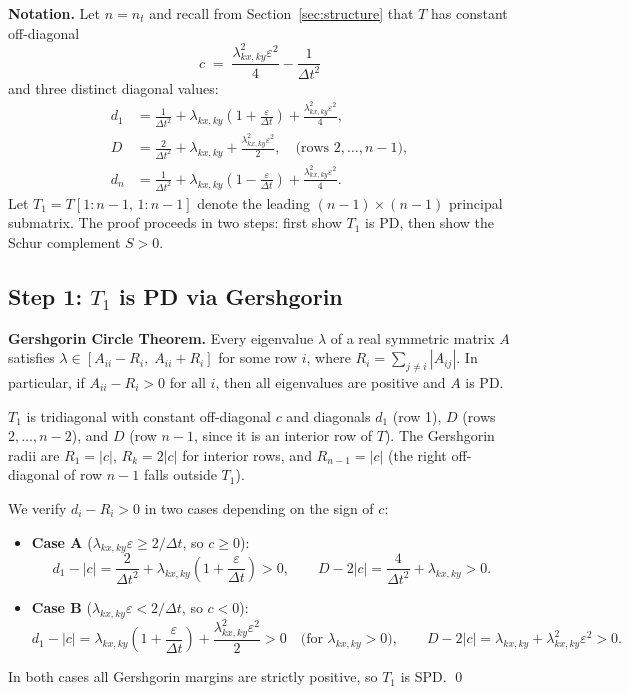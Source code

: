 \documentclass[11pt]{article}
\newcommand{\eps}{\varepsilon}
\newcommand{\dt}{\Delta t}
\newcommand{\lxy}{\lambda_{kx,ky}}
\begin{document}
\medskip
\noindent
\textbf{Notation.} Let $n = n_t$ and recall from Section~\ref{sec:structure} that
$T$ has constant off-diagonal
\[
  c \;=\; \frac{\lxy^2 \eps^2}{4} - \frac{1}{\dt^2}
\]
and three distinct diagonal values:
\begin{align*}
  d_1   &= \frac{1}{\dt^2} + \lxy\!\left(1+\frac{\eps}{\dt}\right) + \frac{\lxy^2\eps^2}{4}, \\
  D     &= \frac{2}{\dt^2} + \lxy + \frac{\lxy^2\eps^2}{2},
            \quad \text{(rows } 2,\ldots,n-1\text{)}, \\
  d_n   &= \frac{1}{\dt^2} + \lxy\!\left(1-\frac{\eps}{\dt}\right) + \frac{\lxy^2\eps^2}{4}.
\end{align*}
Let $T_1 = T[1:n-1,\,1:n-1]$ denote the leading $(n-1)\times(n-1)$ principal submatrix.
The proof proceeds in two steps: first show $T_1$ is PD, then show the Schur complement
$S > 0$.

\subsection{Step 1: $T_1$ is PD via Gershgorin}

\textbf{Gershgorin Circle Theorem.}
Every eigenvalue $\lambda$ of a real symmetric matrix $A$ satisfies
$\lambda \in [A_{ii} - R_i,\; A_{ii} + R_i]$ for some row $i$,
where $R_i = \sum_{j \neq i} |A_{ij}|$.
In particular, if $A_{ii} - R_i > 0$ for all $i$, then all eigenvalues are positive
and $A$ is PD.

\medskip
$T_1$ is tridiagonal with constant off-diagonal $c$ and diagonals
$d_1$ (row 1), $D$ (rows $2,\ldots,n-2$), and $D$ (row $n-1$, since it is an interior row of $T$).
The Gershgorin radii are $R_1 = |c|$, $R_k = 2|c|$ for interior rows, and $R_{n-1} = |c|$
(the right off-diagonal of row $n-1$ falls outside $T_1$).

\medskip\noindent
We verify $d_i - R_i > 0$ in two cases depending on the sign of $c$:

\begin{itemize}
  \item \textbf{Case A} ($\lxy\eps \geq 2/\dt$, so $c \geq 0$):
    \[
      d_1 - |c| = \frac{2}{\dt^2} + \lxy\!\left(1+\frac{\eps}{\dt}\right) > 0,
      \qquad
      D - 2|c|  = \frac{4}{\dt^2} + \lxy > 0.
    \]
  \item \textbf{Case B} ($\lxy\eps < 2/\dt$, so $c < 0$):
    \[
      d_1 - |c| = \lxy\!\left(1+\frac{\eps}{\dt}\right) + \frac{\lxy^2\eps^2}{2} > 0
      \quad \text{(for } \lxy > 0\text{)},
      \qquad
      D - 2|c|  = \lxy + \lxy^2\eps^2 > 0.
    \]
\end{itemize}
In both cases all Gershgorin margins are strictly positive, so $T_1$ is SPD. \qed
\end{document}
